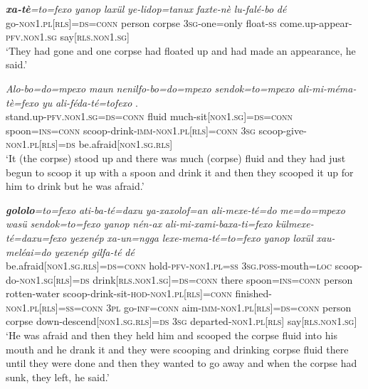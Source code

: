\documentclass[output=paper]{LSP/langsci}
\begin{document}
\begin{exe}
 \label{Devex:App4}			
\gll \textit{\textbf{xa-tè}=to=fexo} \textit{yanop} \textit{laxül}	\textit{ye-lidop=tanux} \textit{faxte-nè} \textit{lu-falé-bo} \textit{dé}\\
go-\textsc{non1.pl[rls]=ds=conn}	person corpse \textsc{3sg}-one=only float-\textsc{ss}	come.up-appear-\textsc{pfv.non1.sg} say[\textsc{rls.non1.sg}]\\
\glt `They had gone and one corpse had floated up and had made an appearance, he said.'
\end{exe}			
			
\begin{exe}
 \label{Devex:App5}			
\gll \textit{Alo-bo=do=mpexo} \textit{maun} \textit{nenilfo-bo=do=mpexo} \textit{sendok=to=mpexo} \textit{ali-mi-méma-tè=fexo} \textit{yu} \textit{ali-féda-té=tofexo} \underline{\textit{}}.\\
stand.up-\textsc{pfv.non1.sg=ds=conn} fluid much-sit[\textsc{non1.sg}]=\textsc{ds=conn} spoon=\textsc{ins=conn}	scoop-drink-\textsc{imm-non1.pl[rls]=conn} \textsc{3sg} scoop-give-\textsc{non1.pl[rls]=ds} be.afraid[\textsc{non1.sg.rls}]\\
\glt `It (the corpse) stood up and there was much (corpse) fluid and they had just begun to scoop it up with a spoon and drink it and then they scooped it up for him to drink but he was afraid.'\\
\end{exe}			
	
\begin{exe}
 \label{Devex:App6}			
\gll \textit{\textbf{gololo}=to=fexo}	\textit{ati-ba-té=daxu}	\textit{ya-xaxolof=an} \textit{ali-mexe-té=do} \textit{me=do=mpexo} \textit{wasü} \textit{sendok=to=fexo} \textit{yanop} \textit{nén-ax} \textit{ali-mi-xami-baxa-ti=fexo} \textit{külmexe-té=daxu=fexo} \textit{yexenép} \textit{xa-un=ngga} \textit{lexe-mema-té=to=fexo} \textit{yanop} \textit{loxül} \textit{xau-meléai=do} \textit{yexenép} \textit{gilfa-té} \textit{dé}\\
be.afraid[\textsc{non1.sg.rls}]=\textsc{ds=conn} hold-\textsc{pfv-non1.pl=ss} \textsc{3sg.poss}-mouth=\textsc{loc} scoop-do-\textsc{non1.sg[rls]=ds} drink[\textsc{rls.non1.sg}]=\textsc{ds=conn} there spoon=\textsc{ins=conn}	person rotten-water scoop-drink-sit-\textsc{hod-non1.pl[rls]=conn} finished-\textsc{non1.pl[rls]=ss=conn} \textsc{3pl}	go-\textsc{inf=conn}	aim-\textsc{imm-non1.pl[rls]=ds=conn} person	corpse down-descend[\textsc{non1.sg.rls}]=\textsc{ds} \textsc{3sg} departed-\textsc{non1.pl[rls]} say[\textsc{rls.non1.sg}]\\
\glt `He was afraid and then they held him and scooped the corpse fluid into his mouth and he drank it and they were scooping  and drinking corpse fluid  there until they were done and then they wanted to go away and when the corpse had sunk, they left, he said.'\\		
\end{exe}						
			
\end{document}
